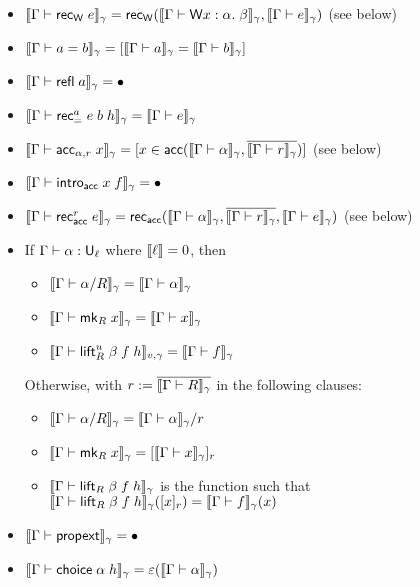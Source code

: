 \begin{itemize}
\item $\scott{\Gamma\vdash\rec_\W\;e}_\gamma=\rec_\W(\scott{\Gamma\vdash\W x:\alpha.\;\beta}_\gamma,\scott{\Gamma\vdash e}_\gamma)$ (see below)
\item $\scott{\Gamma\vdash a=b}_\gamma=[\scott{\Gamma\vdash a}_\gamma=\scott{\Gamma\vdash b}_\gamma]$
\item $\scott{\Gamma\vdash \refl\;a}_\gamma=\bullet$
\item $\scott{\Gamma\vdash\rec_=^a\;e\;b\;h}_\gamma=\scott{\Gamma\vdash e}_\gamma$
\item $\scott{\Gamma\vdash\acc_{\alpha,r}\;x}_\gamma=[x\in\acc(\scott{\Gamma\vdash \alpha}_\gamma,\overline{\scott{\Gamma\vdash r}_\gamma})]$ (see below)
\item $\scott{\Gamma\vdash\intro_\acc\;x\;f}_\gamma=\bullet$
\item $\scott{\Gamma\vdash\rec_\acc^r\;e}_\gamma=\rec_\acc(\scott{\Gamma\vdash\alpha}_\gamma,\overline{\scott{\Gamma\vdash r}_\gamma},\scott{\Gamma\vdash e}_\gamma)$ (see below)
\item If $\Gamma\vdash\alpha:\U_\ell$ where $\llbracket \ell\rrbracket=0$, then
\begin{itemize}
\item $\scott{\Gamma\vdash\alpha/R}_\gamma=\scott{\Gamma\vdash\alpha}_\gamma$
\item $\scott{\Gamma\vdash\mk_R\;x}_\gamma=\scott{\Gamma\vdash x}_\gamma$
\item $\scott{\Gamma\vdash\lift^u_R\;\beta\;f\;h}_{v,\gamma}=\scott{\Gamma\vdash f}_\gamma$
\end{itemize}
Otherwise, with $r:=\overline{\scott{\Gamma\vdash R}_\gamma}$ in the following clauses:
\begin{itemize}
\item $\scott{\Gamma\vdash\alpha/R}_\gamma=\scott{\Gamma\vdash\alpha}_\gamma/r$
\item $\scott{\Gamma\vdash\mk_R\;x}_\gamma=[\scott{\Gamma\vdash x}_\gamma]_r$
\item $\scott{\Gamma\vdash\lift_R\;\beta\;f\;h}_\gamma$ is the function such that $\scott{\Gamma\vdash\lift_R\;\beta\;f\;h}_\gamma([x]_r)=\scott{\Gamma\vdash f}_\gamma(x)$
\end{itemize}
\item $\scott{\Gamma\vdash\mathsf{propext}}_\gamma=\bullet$
\item $\scott{\Gamma\vdash\mathsf{choice}\;\alpha\;h}_\gamma=\vep(\scott{\Gamma\vdash\alpha}_\gamma)$
\end{itemize}

